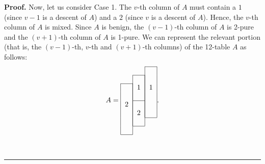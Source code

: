 \documentclass[numbers=enddot,12pt,final,onecolumn,notitlepage]{scrartcl}%
\theoremstyle{definition}
\newenvironment{proof}[1][Proof]{\noindent\textbf{#1.} }{\ \rule{0.5em}{0.5em}}
\begin{document}
\begin{proof}
Now, let us consider Case 1.
The $v$-th column of $A$ must contain a $1$ (since $v-1$ is a descent of $A$)
and a $2$ (since $v$ is a descent of $A$). Hence, the $v$-th column of $A$ is
mixed. Since $A$ is benign, the $\left(  v-1\right)  $-th column of $A$ is
2-pure and the
$\left(  v+1\right)  $-th column of $A$ is 1-pure. We can represent the
relevant portion (that is, the $\left(v-1\right)$-th, $v$-th and
$\left(v+1\right)$-th columns) of the 12-table $A$ as follows:
\begin{equation}
A=%
\begin{tabular}{ccc}
\cline{3-3} & & \multicolumn{1}{|c|}{} \\
\cline{2-2} & \multicolumn{1}{|c|}{} & \multicolumn{1}{|c|}{} \\
\cline{1-1} \multicolumn{1}{|c|}{} & \multicolumn{1}{|c|}{1} & \multicolumn
{1}{|c|}{1} \\
\multicolumn{1}{|c|}{} & \multicolumn{1}{|c|}{} & \multicolumn{1}{|c|}{} \\
\cline{2-2} \multicolumn{1}{|c|}{2} & \multicolumn{1}{|c|}{} & \multicolumn
{1}{|c|}{} \\
\multicolumn{1}{|c|}{} & \multicolumn{1}{|c|}{2} & \multicolumn{1}{|c|}{} \\
\cline{3-3} \multicolumn{1}{|c|}{} & \multicolumn{1}{|c|}{} \\
\cline{2-2} \multicolumn{1}{|c|}{} \\
\cline{1-1}
\end{tabular}%
. \label{pf.prop.descent-resolution.hyps.short.A}%
\end{equation}


\end{proof}
\end{document}
